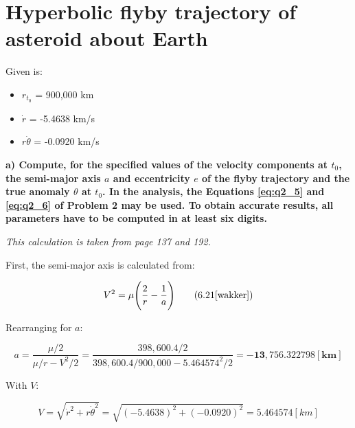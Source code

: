 \section{Hyperbolic flyby trajectory of asteroid about Earth}\label{sec:q3}    

Given is:

\begin{itemize}
    \item $r_{t_{0}}$ = 900,000 km
    \item $\dot{r}$ = -5.4638 km/s
    \item $r\dot{\theta}$ = -0.0920 km/s
\end{itemize}

\noindent \textbf{a) Compute, for the specified values of the velocity components at $t_{0}$, the semi-major axis $a$ and eccentricity $e$ of the flyby trajectory and the true anomaly $\theta$ at $t_{0}$. In the analysis, the Equations \ref{eq:q2_5} and \ref{eq:q2_6} of Problem 2 may be used. To obtain accurate results, all parameters have to be computed in at least six digits.}

\bigskip

\noindent \textit{This calculation is taken from \cite{wakker} page 137 and 192.}

\bigskip

\noindent First, the semi-major axis is calculated from:

\begin{equation}
    V^2 = \mu \Bigg( \frac{2}{r} - \frac{1}{a} \Bigg)
    \tag{6.21\cite{wakker}}
    \label{eq:q3_a1}
\end{equation}

\noindent Rearranging for $a$:

\begin{equation}
    a = \frac{\mu/2}{\mu/r - V^2/2} = \frac{398,600.4/2}{398,600.4/900,000 - 5.464574^2/2} = \boldsymbol{-13,756.322798 [km]}
    \label{eq:q3_a2}
\end{equation}

\noindent With $V$:

\begin{equation}
    V = \sqrt{\dot{r}^2 + r\dot{\theta}^2} = \sqrt{(-5.4638)^2 + (-0.0920)^2} = 5.464574 [km]
    \label{eq:q3_a3}
\end{equation}


